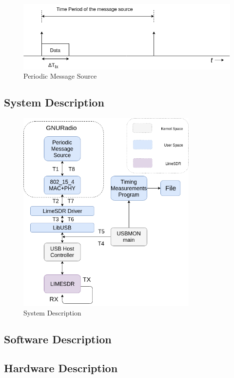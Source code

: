 \begin{figure}[h!]
\centering
\includegraphics[width=\textwidth]{Figure/Message_Source.png}
\caption{Periodic Message Source}
\label{message_source}
\end{figure}


\subsection{System Description}

\begin{figure}[h!]
\centering
\includegraphics[width=0.8\textwidth]{Figure/Setup2.png}
\caption{System Description}
\label{setup_overview}
\end{figure}

\subsection{Software Description}
\subsection{Hardware Description}
